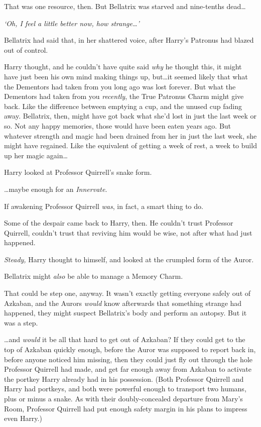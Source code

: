 That was one resource, then. But Bellatrix was starved and nine-tenths dead…

\emph{‘Oh, I feel a little better now, how strange…’}

Bellatrix had said that, in her shattered voice, after Harry’s Patronus had blazed out of control.

Harry thought, and he couldn’t have quite said \emph{why} he thought this, it might have just been his own mind making things up, but…it seemed likely that what the Dementors had taken from you long ago was lost forever. But what the Dementors had taken from you \emph{recently}, the True Patronus Charm might give back. Like the difference between emptying a cup, and the unused cup fading away. Bellatrix, then, might have got back what she’d lost in just the last week or so. Not any happy memories, those would have been eaten years ago. But whatever strength and magic had been drained from her in just the last week, she might have regained. Like the equivalent of getting a week of rest, a week to build up her magic again…

Harry looked at Professor Quirrell’s snake form.

…maybe enough for an \emph{Innervate}.

If awakening Professor Quirrell \emph{was}, in fact, a smart thing to do.

Some of the despair came back to Harry, then. He couldn’t trust Professor Quirrell, couldn’t trust that reviving him would be wise, not after what had just happened.

\emph{Steady,} Harry thought to himself, and looked at the crumpled form of the Auror.

Bellatrix might \emph{also} be able to manage a Memory Charm.

That could be step one, anyway. It wasn’t exactly getting everyone safely out of Azkaban, and the Aurors \emph{would} know afterwards that something strange had happened, they might suspect Bellatrix’s body and perform an autopsy. But it was a step.

…and \emph{would} it be all that hard to get out of Azkaban? If they could get to the top of Azkaban quickly enough, before the Auror was supposed to report back in, before anyone noticed him missing, then they could just fly out through the hole Professor Quirrell had made, and get far enough away from Azkaban to activate the portkey Harry already had in his possession. (Both Professor Quirrell and Harry had portkeys, and both were powerful enough to transport two humans, plus or minus a snake. As with their doubly-concealed departure from Mary’s Room, Professor Quirrell had put enough safety margin in his plans to impress even Harry.)

